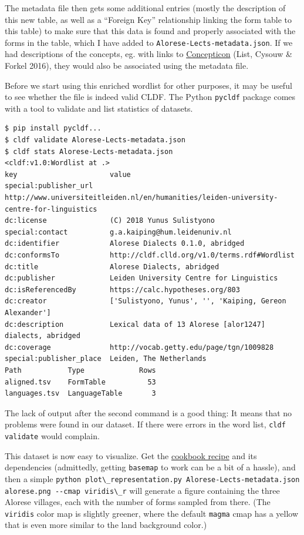 \documentclass[
  a4paper,
  14pt,
  oneside,
  tablecaptionabove
]{scrbook}
\newcommand{\passthrough}[1]{#1}
\begin{document}
The metadata file then gets some additional entries (mostly the
description of this new table, as well as a \enquote{Foreign Key}
relationship linking the form table to this table) to make sure that
this data is found and properly associated with the forms in the table,
which I have added to
\passthrough{\lstinline!Alorese-Lects-metadata.json!}. If we had
descriptions of the concepts, eg. with links to
\href{https://concepticon.clld.org}{Concepticon} (List, Cysouw \& Forkel
2016), they would also be associated using the metadata file.

Before we start using this enriched wordlist for other purposes, it may
be useful to see whether the file is indeed valid CLDF. The Python
\passthrough{\lstinline!pycldf!} package comes with a tool to validate
and list statistics of datasets.

\begin{lstlisting}
$ pip install pycldf...
$ cldf validate Alorese-Lects-metadata.json
$ cldf stats Alorese-Lects-metadata.json
<cldf:v1.0:Wordlist at .>
key                      value
special:publisher_url    http://www.universiteitleiden.nl/en/humanities/leiden-university-centre-for-linguistics
dc:license               (C) 2018 Yunus Sulistyono
special:contact          g.a.kaiping@hum.leidenuniv.nl
dc:identifier            Alorese Dialects 0.1.0, abridged
dc:conformsTo            http://cldf.clld.org/v1.0/terms.rdf#Wordlist
dc:title                 Alorese Dialects, abridged
dc:publisher             Leiden University Centre for Linguistics
dc:isReferencedBy        https://calc.hypotheses.org/803
dc:creator               ['Sulistyono, Yunus', '', 'Kaiping, Gereon Alexander']
dc:description           Lexical data of 13 Alorese [alor1247] dialects, abridged
dc:coverage              http://vocab.getty.edu/page/tgn/1009828
special:publisher_place  Leiden, The Netherlands
Path           Type             Rows
aligned.tsv    FormTable          53
languages.tsv  LanguageTable       3
\end{lstlisting}

The lack of output after the second command is a good thing: It means
that no problems were found in our dataset. If there were errors in the
word list, \passthrough{\lstinline!cldf validate!} would complain.

This dataset is now easy to visualize. Get the
\href{https://github.com/cldf/cookbook/tree/master/recipes/plot_representation}{cookbook
recipe} and its dependencies (admittedly, getting
\passthrough{\lstinline!basemap!} to work can be a bit of a hassle), and
then a simple
\passthrough{\lstinline!python plot\_representation.py Alorese-Lects-metadata.json alorese.png --cmap viridis\_r!}
will generate a figure containing the three Alorese villages, each with
the number of forms sampled from there. (The
\passthrough{\lstinline!viridis!} color map is slightly greener, where
the default \passthrough{\lstinline!magma!} cmap has a yellow that is
even more similar to the land background color.)
\end{document}
